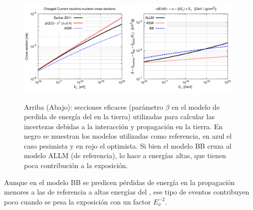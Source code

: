 	\begin{figure}[ht!]
		\begin{center}
			\includegraphics[width=0.49\textwidth]{fig/resultadosAuger/nu_xsection_models}
			\includegraphics[width=0.49\textwidth]{fig/resultadosAuger/tau_E_loss_models}
			\caption{Arriba (Abajo): secciones eficaces (parámetro $\beta$ en el modelo de perdida de energía del \tauon{} en la tierra) utilizadas para calcular las incertezas debidas a la interacción y propagación en la tierra. En negro se muestran los modelos utilizadas como referencia, en azul el caso pesimista y en rojo el optimista. Si bien el modelo BB cruza al modelo ALLM (de referencia), lo hace a energías altas, que tienen poca contribución a la exposición. }
			\label{fig:crossSectionSist}
		\end{center}
	\end{figure}
	Aunque en el modelo BB se predicen pérdidas de energía en la propagación menores a las de referencia a altas energías del \tauon{}, ese tipo de eventos contribuyen poco cuando se pesa la exposición con un factor $E_\nu^{-2}$.
	
